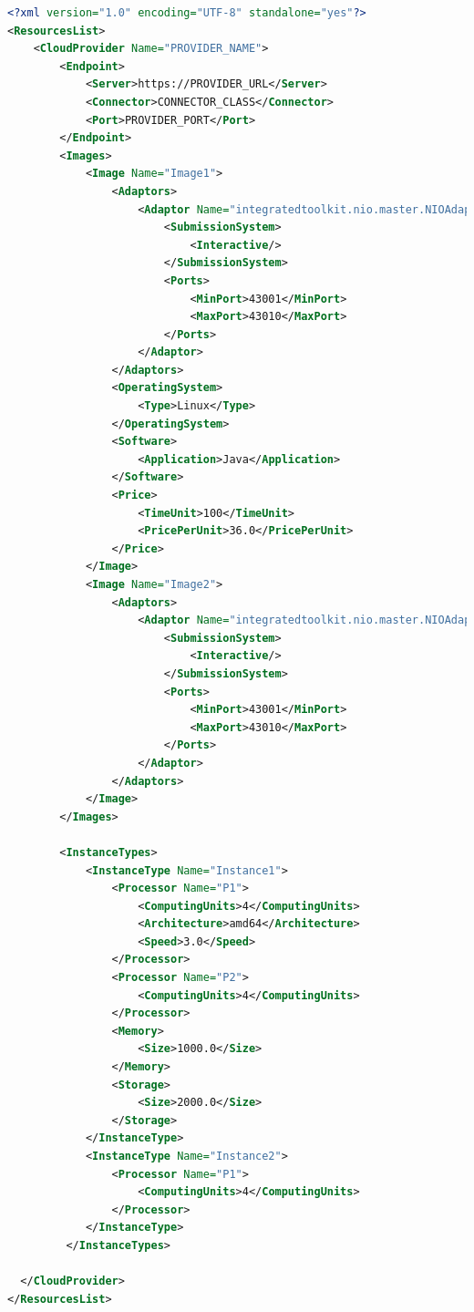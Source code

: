 \begin{lstlisting}[language=xml]
<?xml version="1.0" encoding="UTF-8" standalone="yes"?>
<ResourcesList>
    <CloudProvider Name="PROVIDER_NAME">
        <Endpoint>
            <Server>https://PROVIDER_URL</Server>
            <Connector>CONNECTOR_CLASS</Connector>
            <Port>PROVIDER_PORT</Port>
        </Endpoint>
        <Images>
            <Image Name="Image1">
                <Adaptors>
                    <Adaptor Name="integratedtoolkit.nio.master.NIOAdaptor">
                        <SubmissionSystem>
                            <Interactive/>
                        </SubmissionSystem>
                        <Ports>
                            <MinPort>43001</MinPort>
                            <MaxPort>43010</MaxPort>
                        </Ports>
                    </Adaptor>
                </Adaptors>
                <OperatingSystem>
                    <Type>Linux</Type>
                </OperatingSystem>
                <Software>
                    <Application>Java</Application>
                </Software>
                <Price>
                    <TimeUnit>100</TimeUnit>
                    <PricePerUnit>36.0</PricePerUnit>
                </Price>
            </Image>
            <Image Name="Image2">
                <Adaptors>
                    <Adaptor Name="integratedtoolkit.nio.master.NIOAdaptor">
                        <SubmissionSystem>
                            <Interactive/>
                        </SubmissionSystem>
                        <Ports>
                            <MinPort>43001</MinPort>
                            <MaxPort>43010</MaxPort>
                        </Ports>
                    </Adaptor>
                </Adaptors>
            </Image>
        </Images>
    
        <InstanceTypes>
            <InstanceType Name="Instance1">
                <Processor Name="P1">
                    <ComputingUnits>4</ComputingUnits>
                    <Architecture>amd64</Architecture>
                    <Speed>3.0</Speed>
                </Processor>
                <Processor Name="P2">
                    <ComputingUnits>4</ComputingUnits>
                </Processor>
                <Memory>
                    <Size>1000.0</Size>
                </Memory>
                <Storage>
                    <Size>2000.0</Size>
                </Storage>
            </InstanceType>
            <InstanceType Name="Instance2">
                <Processor Name="P1">
                    <ComputingUnits>4</ComputingUnits>
                </Processor>
            </InstanceType>
         </InstanceTypes>

  </CloudProvider>
</ResourcesList>
\end{lstlisting}

